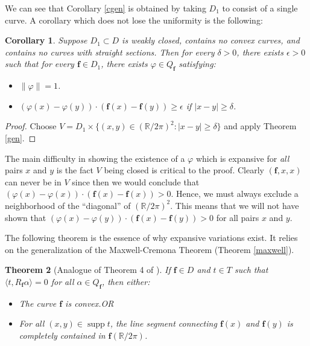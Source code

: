 \documentclass{amsart}
\newcommand{\R}			{\mathbb R}
\newcommand{\f}			{\mathbf f}
\newcommand{\cross}		{\times}
\newtheorem{theorem}{Theorem}[section]
\newtheorem{corollary}[theorem]{Corollary}
\numberwithin{equation}{section}
\begin{document}
We can see that Corollary \ref{cgen} is obtained by taking $D_1$ 
to consist of a single curve.  A corollary which does not lose 
the uniformity is the following:

\begin{corollary}
Suppose $D_1\subset D$ is weakly closed, contains no convex 
curves, and contains no curves with straight sections.  Then 
for every $\delta>0$, there exists $\epsilon>0$ such that for 
every $\f\in D_1$, there exists $\varphi\in Q_\f$ satisfying:
\begin{itemize}
\item[(1)] $\|\varphi\|=1$.
\item[(2)] $(\varphi(x)-\varphi(y))\cdot(\f(x)-\f(y))\geq\epsilon$ if $|x-y|\geq\delta$.
\end{itemize}
\end{corollary}

\begin{proof}
Choose $V=D_1\cross\{(x,y)\in(\R/2\pi)^2:|x-y|\geq\delta\}$ and apply 
Theorem \ref{gen}.
\end{proof}

The main difficulty in showing the existence of a $\varphi$ 
which is expansive for {\it all} pairs $x$ and $y$ 
is the fact $V$ being closed is critical to the proof.  Clearly 
$(\f,x,x)$ can never be in $V$ since then we would conclude 
that $(\varphi(x)-\varphi(x))\cdot(\f(x)-\f(x))>0$.  Hence, we 
must always exclude a neighborhood of the ``diagonal'' of 
$(\R/2\pi)^2$.  This means that we will not have shown that 
$(\varphi(x)-\varphi(y))\cdot(\f(x)-\f(y))>0$ for all 
pairs $x$ and $y$.

The following theorem is the essence of why expansive variations 
exist.  It relies on the generalization of the Maxwell-Cremona 
Theorem (Theorem \ref{maxwell}).

\begin{theorem}[Analogue of Theorem 4 of {\cite[p. 216]{cdr}}]\label{needmax}
If $\f\in D$ and $t\in T$ such that 
$\langle t,R_\f\alpha\rangle=0$ for all $\alpha\in Q_\f$, then 
either:
\begin{itemize}
\item[(1)] The curve $\f$ is convex.\newline OR
\item[(2)] For all $(x,y)\in\operatorname{supp}t$, the line 
segment connecting $\f(x)$ and $\f(y)$ 
is completely contained in $\f(\R/2\pi)$.
\end{itemize}
\end{theorem}
\end{document}
